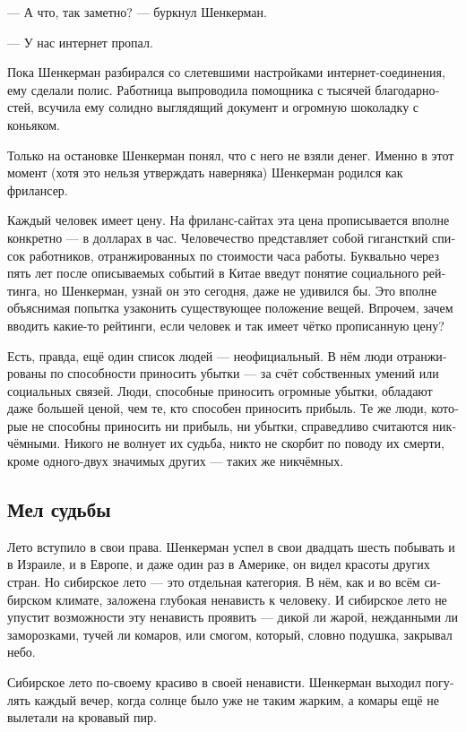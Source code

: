 \documentclass[a5paper,12pt,fleqn]{extbook}\usepackage{cooltooltips}\usepackage{polyglossia}\setdefaultlanguage[babelshorthands=true]{russian}\setotherlanguage{english}\defaultfontfeatures{Ligatures=TeX,Mapping=tex-text} \usepackage{xcolor}\definecolor{lightgray}{HTML}{bbbbbb}\color{lightgray}\newcommand{\ml}[3]{\textenglish{\textcolor{black}{#3}}}
\begin{document}
--- А что, так заметно? --- буркнул Шенкерман.

--- У нас интернет пропал.

Пока Шенкерман разбирался со слетевшими настройками интернет-соединения, ему сделали полис.
Работница выпроводила помощника с тысячей благодарностей, всучила ему солидно выглядящий документ и огромную шоколадку с коньяком.

Только на остановке Шенкерман понял, что с него не взяли денег.
Именно в этот момент (хотя это нельзя утверждать наверняка) Шенкерман родился как фрилансер.

Каждый человек имеет цену.
На фриланс-сайтах эта цена прописывается вполне конкретно --- в долларах в час.
Человечество представляет собой гигансткий список работников, отранжированных по стоимости часа работы.
Буквально через пять лет после описываемых событий в Китае введут понятие социального рейтинга, но Шенкерман, узнай он это сегодня, даже не удивился бы.
Это вполне объяснимая попытка узаконить существующее положение вещей.
Впрочем, зачем вводить какие-то рейтинги, если человек и так имеет чётко прописанную цену?

Есть, правда, ещё один список людей --- неофициальный.
В нём люди отранжированы по способности приносить убытки --- за счёт собственных умений или социальных связей.
Люди, способные приносить огромные убытки, обладают даже большей ценой, чем те, кто способен приносить прибыль.
Те же люди, которые не способны приносить ни прибыль, ни убытки, справедливо считаются никчёмными.
Никого не волнует их судьба, никто не скорбит по поводу их смерти, кроме одного-двух значимых других --- таких же никчёмных.

\subsection{Мел судьбы}

Лето вступило в свои права.
Шенкерман успел в свои двадцать шесть побывать и в Израиле, и в Европе, и даже один раз в Америке, он видел красоты других стран.
Но сибирское лето --- это отдельная категория.
В нём, как и во всём сибирском климате, заложена глубокая ненависть к человеку.
И сибирское лето не упустит возможности эту ненависть проявить --- дикой ли жарой, нежданными ли заморозками, тучей ли комаров, или смогом, который, словно подушка, закрывал небо.

Сибирское лето по-своему красиво в своей ненависти.
Шенкерман выходил погулять каждый вечер, когда солнце было уже не таким жарким, а комары ещё не вылетали на кровавый пир.
\end{document}
